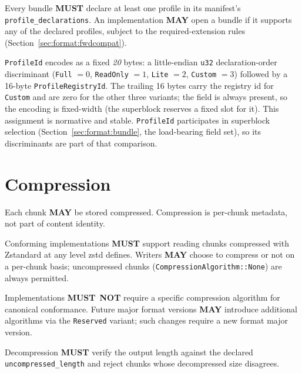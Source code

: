 \documentclass[11pt,letterpaper]{report}
\newcounter{requirement}[chapter]
\newcommand{\MUST}{\textbf{MUST}}
\newcommand{\MUSTNOT}{\textbf{MUST}\nobreak\ \textbf{NOT}}
\newcommand{\MAY}{\textbf{MAY}}
\begin{document}
\begin{requirement}
  \label{req:format:profile-support}
  Every bundle \MUST{} declare at least one profile in its manifest's
  \texttt{profile\_declarations}. An implementation \MAY{} open a
  bundle if it supports any of the declared profiles, subject to
  the required-extension rules
  (Section~\ref{sec:format:fwdcompat}).
\end{requirement}

\begin{requirement}
  \label{req:format:profileid-discriminants}
  \texttt{ProfileId} encodes as a fixed \emph{20} bytes: a
  little-endian \texttt{u32} declaration-order discriminant
  (\texttt{Full} $= 0$, \texttt{ReadOnly} $= 1$, \texttt{Lite} $= 2$,
  \texttt{Custom} $= 3$) followed by a 16-byte
  \texttt{ProfileRegistryId}. The trailing 16 bytes carry the registry
  id for \texttt{Custom} and are zero for the other three variants; the
  field is always present, so the encoding is fixed-width (the
  superblock reserves a fixed slot for it). This assignment is
  normative and stable.
  \texttt{ProfileId} participates in superblock selection
  (Section~\ref{sec:format:bundle}, the load-bearing field set), so
  its discriminants are part of that comparison.
\end{requirement}

\section{Compression}
\label{sec:format:compression}

Each chunk \MAY{} be stored compressed. Compression is per-chunk
metadata, not part of content identity.

\begin{requirement}
  \label{req:format:zstandard-support}
  Conforming implementations \MUST{} support reading chunks
  compressed with Zstandard at any level zstd defines. Writers
  \MAY{} choose to compress or not on a per-chunk basis;
  uncompressed chunks (\texttt{CompressionAlgorithm::None}) are
  always permitted.

  Implementations \MUSTNOT{} require a specific compression
  algorithm for canonical conformance. Future major format
  versions \MAY{} introduce additional algorithms via the
  \texttt{Reserved} variant; such changes require a new format
  major version.

  Decompression \MUST{} verify the output length against the
  declared \texttt{uncompressed\_length} and reject chunks whose
  decompressed size disagrees.
\end{requirement}
\end{document}
